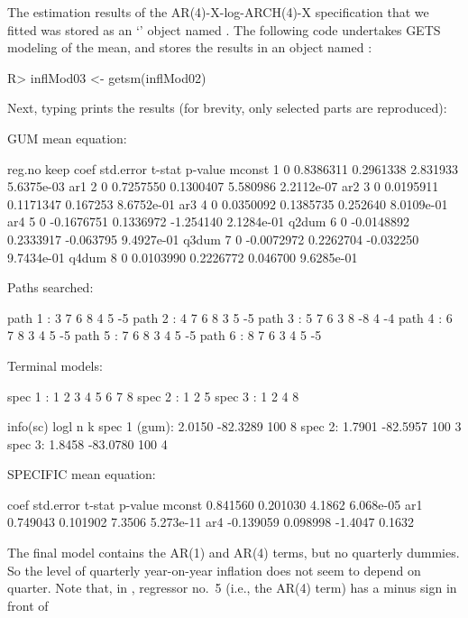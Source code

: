 \documentclass[article,nojss]{jss}
\begin{document}
The estimation results of the AR(4)-X-log-ARCH(4)-X specification that
we fitted was stored as an `' object named
. The following code undertakes GETS modeling of the
mean, and stores the results in an object named :
%
\begin{CodeChunk}
\begin{CodeInput}
R> inflMod03 <- getsm(inflMod02)
\end{CodeInput}
\end{CodeChunk}
%
Next, typing  prints the results (for brevity, only selected parts are reproduced):
%
\begin{CodeChunk}
\begin{CodeOutput}
GUM mean equation:

       reg.no keep       coef  std.error    t-stat    p-value
mconst      1    0  0.8386311  0.2961338  2.831933 5.6375e-03
ar1         2    0  0.7257550  0.1300407  5.580986 2.2112e-07
ar2         3    0  0.0195911  0.1171347  0.167253 8.6752e-01
ar3         4    0  0.0350092  0.1385735  0.252640 8.0109e-01
ar4         5    0 -0.1676751  0.1336972 -1.254140 2.1284e-01
q2dum       6    0 -0.0148892  0.2333917 -0.063795 9.4927e-01
q3dum       7    0 -0.0072972  0.2262704 -0.032250 9.7434e-01
q4dum       8    0  0.0103990  0.2226772  0.046700 9.6285e-01
	
Paths searched: 

path 1 : 3 7 6 8 4 5 -5 
path 2 : 4 7 6 8 3 5 -5 
path 3 : 5 7 6 3 8 -8 4 -4 
path 4 : 6 7 8 3 4 5 -5 
path 5 : 7 6 8 3 4 5 -5 
path 6 : 8 7 6 3 4 5 -5
	
Terminal models: 

spec 1 : 1 2 3 4 5 6 7 8 
spec 2 : 1 2 5 
spec 3 : 1 2 4 8 

              info(sc)     logl   n   k
spec 1 (gum):   2.0150 -82.3289 100   8
spec 2:         1.7901 -82.5957 100   3
spec 3:         1.8458 -83.0780 100   4

SPECIFIC mean equation:

            coef std.error  t-stat   p-value
mconst  0.841560  0.201030  4.1862 6.068e-05
ar1     0.749043  0.101902  7.3506 5.273e-11
ar4    -0.139059  0.098998 -1.4047    0.1632
\end{CodeOutput}
\end{CodeChunk}
%
The final model contains the AR(1) and AR(4) terms, but no quarterly
dummies. So the level of quarterly year-on-year inflation does not
seem to depend on quarter. Note that, in ,
regressor no.\ 5 (i.e., the AR(4) term) has a minus sign in front of
\end{document}
